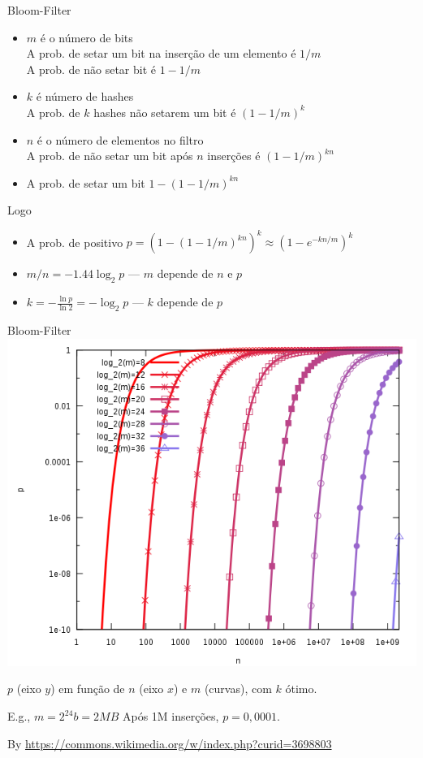 \begin{frame}{Bloom-Filter}
\begin{itemize}
	\item $m$ é o número de bits\\
	A prob. de setar um bit na inserção de um elemento é $1/m$\\
	A prob. de não setar bit é $1 - 1/m$
	
	\item $k$ é número de hashes\\
	A prob. de $k$ hashes não setarem um bit é $(1 - 1/m)^k$
	
	\item $n$ é o número de elementos no filtro\\
	A prob. de não setar um bit após $n$ inserções é $(1 - 1/m)^{kn}$

	\item A prob. de setar um bit $1 - (1 - 1/m)^{kn}$
\end{itemize}

Logo
\begin{itemize}
	\item A prob. de positivo $p = (1 - (1 - 1/m)^{kn})^k \approx (1 - e^{-kn/m})^k$
	\item $m/n = - 1.44\log_2 p$ --- $m$ depende de $n$ e $p$
	\item $k = - \frac{\ln p}{\ln 2} = - \log_2 p$ --- $k$ depende de $p$
\end{itemize}
\end{frame}

\begin{frame}{Bloom-Filter}
\includegraphics[width=.7\textwidth]{./images/bf_prob.png}

$p$ (eixo $y$) em função de $n$ (eixo $x$) e $m$ (curvas), com $k$ ótimo.

E.g., $m = 2^{24}b = 2MB$ Após 1M inserções, $p = 0,0001$.

By \href{Jerz4835}{https://commons.wikimedia.org/w/index.php?curid=3698803}
\end{frame}


